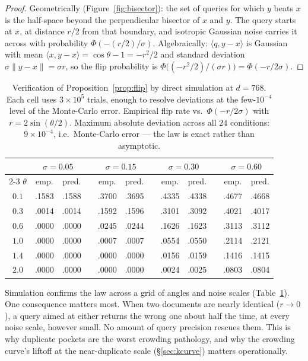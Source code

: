 \documentclass[11pt,letterpaper]{article}
\begin{document}
\begin{proof}
Geometrically (Figure~\ref{fig:bisector}): the set of queries for
which $y$ beats $x$ is the half-space beyond the perpendicular bisector
of $x$ and $y$. The query starts at $x$, at distance $r/2$ from that
boundary, and isotropic Gaussian noise carries it across with
probability $\Phi(-(r/2)/\sigma)$. Algebraically: $\langle q, y -
x\rangle$ is Gaussian with mean $\langle x, y - x\rangle = \cos\theta
- 1 = -r^2/2$ and standard deviation $\sigma \lVert y - x\rVert =
\sigma r$, so the flip probability is
$\Phi\big((-r^2/2)/(\sigma r)\big) = \Phi(-r/2\sigma)$.
\end{proof}

\begin{table}[t]
\centering
\caption{Verification of Proposition~\ref{prop:flip} by direct
simulation at $d = 768$. Each cell uses $3{\times}10^5$ trials, enough
to resolve deviations at the few-$10^{-4}$ level of the Monte-Carlo
error. Empirical flip rate vs.\
$\Phi(-r/2\sigma)$ with $r = 2\sin(\theta/2)$. Maximum absolute deviation
across all $24$ conditions: $9{\times}10^{-4}$, i.e.\ Monte-Carlo error --- the law is
exact rather than asymptotic.}
\label{tab:flip}
\small
\begin{tabular}{c cc c cc c cc c cc}
\toprule
& \multicolumn{2}{c}{$\sigma=0.05$} && \multicolumn{2}{c}{$\sigma=0.15$}
&& \multicolumn{2}{c}{$\sigma=0.30$} && \multicolumn{2}{c}{$\sigma=0.60$}\\
\cmidrule{2-3}\cmidrule{5-6}\cmidrule{8-9}\cmidrule{11-12}
$\theta$ & emp. & pred. && emp. & pred. && emp. & pred. && emp. & pred.\\
\midrule
$0.1$ & .1583 & .1588 && .3700 & .3695 && .4335 & .4338 && .4677 & .4668\\
$0.3$ & .0014 & .0014 && .1592 & .1596 && .3101 & .3092 && .4021 & .4017\\
$0.6$ & .0000 & .0000 && .0245 & .0244 && .1626 & .1623 && .3113 & .3112\\
$1.0$ & .0000 & .0000 && .0007 & .0007 && .0554 & .0550 && .2114 & .2121\\
$1.4$ & .0000 & .0000 && .0000 & .0000 && .0156 & .0159 && .1416 & .1415\\
$2.0$ & .0000 & .0000 && .0000 & .0000 && .0024 & .0025 && .0803 & .0804\\
\bottomrule
\end{tabular}
\end{table}

Simulation confirms the law across a grid of angles and noise scales
(Table~\ref{tab:flip}). One consequence matters most. When two documents
are nearly identical ($r \to 0$), a query aimed at either returns the
wrong one about half the time, at every noise scale, however small. No
amount of query precision rescues them. This is why duplicate pockets
are the worst crowding pathology, and why the crowding curve's liftoff
at the near-duplicate scale (\S\ref{sec:kcurve}) matters operationally.
\end{document}
